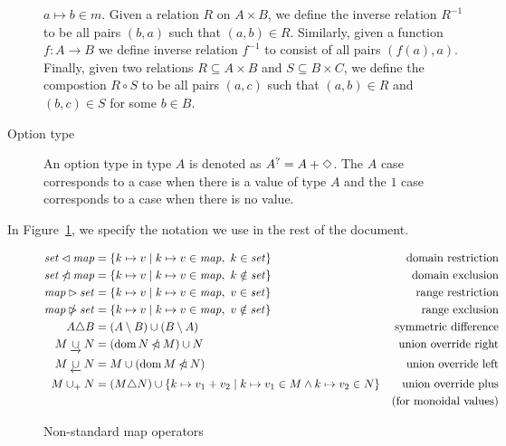 \begin{description}
    $a\mapsto b \in m$.
    Given a relation $R$ on $A\times B$, we define the inverse relation $R^{-1}$ to be
    all pairs $(b, a)$ such that $(a, b)\in R$. Similarly, given a function $f:A\to B$ we
    define inverse relation $f^{-1}$ to consist of all pairs $(f(a), a)$.
    Finally, given two relations $R\subseteq A\times B$ and $S\subseteq B\times C$,
    we define the compostion $R\circ S$ to be all pairs $(a, c)$ such that
    $(a, b)\in R$ and $(b, c)\in S$ for some $b\in B$.
  \item[Option type] An option type in type $A$ is denoted as $A^? = A + \Diamond$. The
    $A$ case corresponds to a case when there is a value of type $A$ and the $1$
    case corresponds to a case when there is no value.

\end{description}

In Figure~\ref{fig:notation:nonstandard}, we specify the notation we use in
the rest of the document.

\begin{figure}[htb]
  \begin{align*}
    \mathit{set} \lhd \mathit{map}
    & = \{ k \mapsto v \mid k \mapsto v \in \mathit{map}, ~ k \in \mathit{set} \}
    & \text{domain restriction}
    \\
    \mathit{set} \mathbin{\slashed{\lhd}} \mathit{map}
    & = \{ k \mapsto v \mid k \mapsto v \in \mathit{map}, ~ k \notin \mathit{set} \}
    & \text{domain exclusion}
    \\
    \mathit{map} \rhd \mathit{set}
    & = \{ k \mapsto v \mid k \mapsto v \in \mathit{map}, ~ v \in \mathit{set} \}
    & \text{range restriction}
    \\
    \mathit{map} \mathbin{\slashed{\rhd}} \mathit{set}
    & = \{ k \mapsto v \mid k \mapsto v \in \mathit{map}, ~ v \notin \mathit{set} \}
    & \text{range exclusion}
    \\
    A \triangle B
    & = (A \setminus B) \cup (B \setminus A)
    & \text{symmetric difference}
    \\
    M \mathbin{\underrightarrow\cup} N
    & = (\operatorname{dom} N \mathbin{\slashed{\lhd}} M)\cup N
    & \text{union override right}
    \\
    M \mathbin{\underleftarrow\cup} N
    & = M \cup (\operatorname{dom} M \mathbin{\slashed{\lhd}} N)
    & \text{union override left}
    \\
    M \mathbin{\cup_{+}} N
    & = (M \triangle N)
    \cup \{k\mapsto v_1+v_2\mid {k\mapsto v_1}\in M \land {k\mapsto v_2}\in N \}
    & \text{union override plus} \\
    & & \text{(for monoidal values)}\\
  \end{align*}
  \caption{Non-standard map operators}
  \label{fig:notation:nonstandard}
\end{figure}

\clearpage
